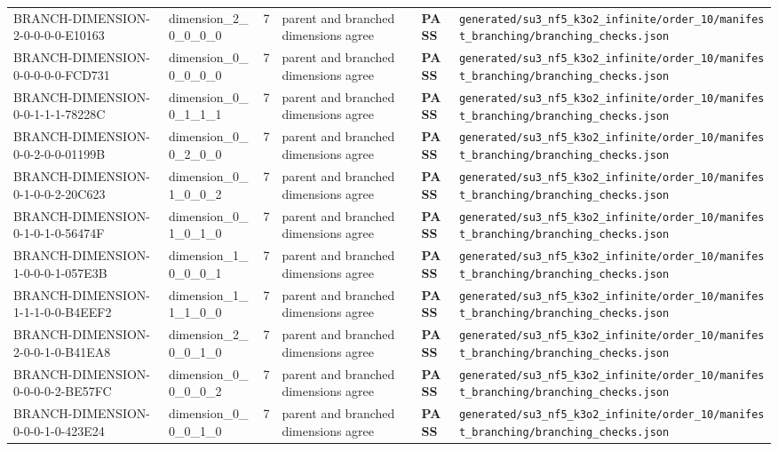 \documentclass[11pt]{article}
\newcommand{\Pass}{\textcolor{green!50!black}{\textbf{PASS}}}
\newcommand{\RawPath}[1]{\texttt{#1}}
\begin{document}
\begin{longtable}{p{3cm}p{2.5cm}r p{3cm}l p{2cm}}
BRANCH-DIMENSION-2-0-0-0-0-E10163 & dimension\_2\_0\_0\_0\_0 & 7 & parent and branched dimensions agree & \Pass & \RawPath{generated/su3\_nf5\_k3o2\_infinite/order\_10/manifest\_branching/branching\_checks.json}\\
BRANCH-DIMENSION-0-0-0-0-0-FCD731 & dimension\_0\_0\_0\_0\_0 & 7 & parent and branched dimensions agree & \Pass & \RawPath{generated/su3\_nf5\_k3o2\_infinite/order\_10/manifest\_branching/branching\_checks.json}\\
BRANCH-DIMENSION-0-0-1-1-1-78228C & dimension\_0\_0\_1\_1\_1 & 7 & parent and branched dimensions agree & \Pass & \RawPath{generated/su3\_nf5\_k3o2\_infinite/order\_10/manifest\_branching/branching\_checks.json}\\
BRANCH-DIMENSION-0-0-2-0-0-01199B & dimension\_0\_0\_2\_0\_0 & 7 & parent and branched dimensions agree & \Pass & \RawPath{generated/su3\_nf5\_k3o2\_infinite/order\_10/manifest\_branching/branching\_checks.json}\\
BRANCH-DIMENSION-0-1-0-0-2-20C623 & dimension\_0\_1\_0\_0\_2 & 7 & parent and branched dimensions agree & \Pass & \RawPath{generated/su3\_nf5\_k3o2\_infinite/order\_10/manifest\_branching/branching\_checks.json}\\
BRANCH-DIMENSION-0-1-0-1-0-56474F & dimension\_0\_1\_0\_1\_0 & 7 & parent and branched dimensions agree & \Pass & \RawPath{generated/su3\_nf5\_k3o2\_infinite/order\_10/manifest\_branching/branching\_checks.json}\\
BRANCH-DIMENSION-1-0-0-0-1-057E3B & dimension\_1\_0\_0\_0\_1 & 7 & parent and branched dimensions agree & \Pass & \RawPath{generated/su3\_nf5\_k3o2\_infinite/order\_10/manifest\_branching/branching\_checks.json}\\
BRANCH-DIMENSION-1-1-1-0-0-B4EEF2 & dimension\_1\_1\_1\_0\_0 & 7 & parent and branched dimensions agree & \Pass & \RawPath{generated/su3\_nf5\_k3o2\_infinite/order\_10/manifest\_branching/branching\_checks.json}\\
BRANCH-DIMENSION-2-0-0-1-0-B41EA8 & dimension\_2\_0\_0\_1\_0 & 7 & parent and branched dimensions agree & \Pass & \RawPath{generated/su3\_nf5\_k3o2\_infinite/order\_10/manifest\_branching/branching\_checks.json}\\
BRANCH-DIMENSION-0-0-0-0-2-BE57FC & dimension\_0\_0\_0\_0\_2 & 7 & parent and branched dimensions agree & \Pass & \RawPath{generated/su3\_nf5\_k3o2\_infinite/order\_10/manifest\_branching/branching\_checks.json}\\
BRANCH-DIMENSION-0-0-0-1-0-423E24 & dimension\_0\_0\_0\_1\_0 & 7 & parent and branched dimensions agree & \Pass & \RawPath{generated/su3\_nf5\_k3o2\_infinite/order\_10/manifest\_branching/branching\_checks.json}\\

\end{longtable}
\end{document}
